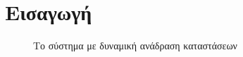 \section{Εισαγωγή}
\newcommand{\kone}{\frac{-k_m}{T_m s + 1}}
\newcommand{\ktwo}{k_{\mu}}
\newcommand{\kthree}{\frac{k_0}{s}}
\begin{figure}[htb]
    \centering
    
    \caption{Το σύστημα με δυναμική ανάδραση καταστάσεων}\label{fig:system-feedback-dynamic}
\end{figure}
